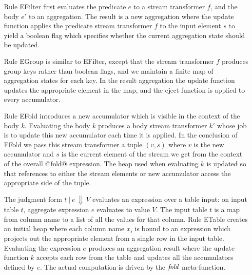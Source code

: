 Rule EFilter first evaluates the predicate $e$ to a stream transformer $f$, and the body $e'$ to an aggregation. The result is a new aggregation where the update function applies the predicate stream transformer $f$ to the input element $s$ to yield a boolean flag which specifies whether the current aggregation state should be updated.

Rule EGroup is similar to EFilter, except that the stream transformer $f$ produces group keys rather than boolean flags, and we maintain a finite map of aggregation states for each key. In the result aggregation the update function updates the appropriate element in the map, and the eject function is applied to every accumulator. 


Rule EFold introduces a new accumulator which is visible in the context of the body $k$. Evaluating the body $k$ produces a body stream transformer $k'$ whose job is to update this new accumulator each time it is applied. In the conclusion of EFold we pass this stream transformer a tuple $(v, s)$ where $v$ is the new accumulator and $s$ is the current element of the stream we get from the context of the overall @fold@ expression. The heap used when evaluating $k$ is updated so that references to either the stream elements or new accumulator access the appropriate side of the tuple.

The judgment form $t~|~e~\Downarrow~V$ evaluates an expression over a table input: on input table $t$, aggregate expression $e$ evaluates to value $V$.
The input table $t$ is a map from column name to a list of all the values for that column.
Rule ETable creates an initial heap where each column name $x_i$ is bound to an expression which projects out the appropriate element from a single row in the input table. Evaluating the expression $e$ produces an aggregation result where the update function $k$ accepts each row from the table and updates all the accumulators defined by $e$. The actual computation is driven by the $\mathit{fold}$ meta-function.


